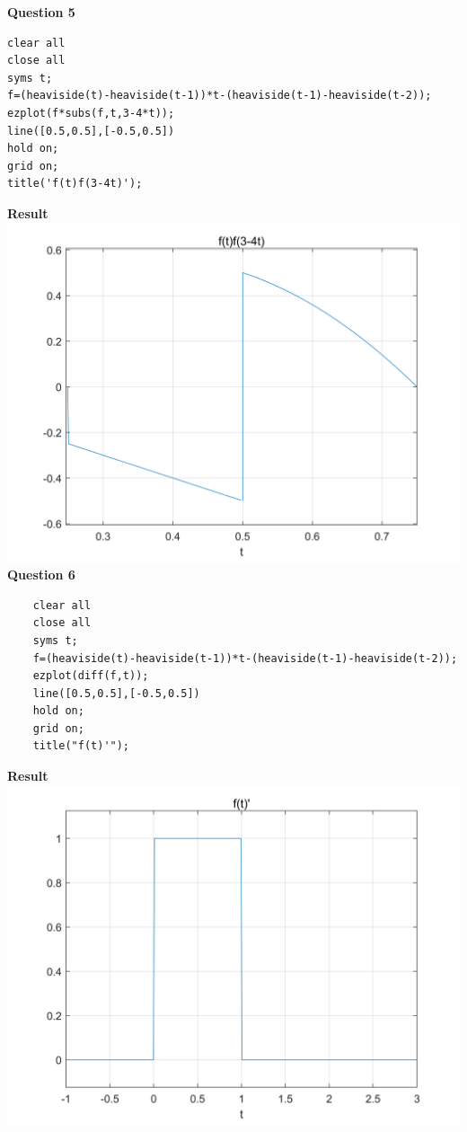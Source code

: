 \documentclass[UTF8,a4paper]{article}
\begin{document}
\textbf{Question 5}\\
\begin{lstlisting}
clear all
close all
syms t;
f=(heaviside(t)-heaviside(t-1))*t-(heaviside(t-1)-heaviside(t-2));
ezplot(f*subs(f,t,3-4*t));
line([0.5,0.5],[-0.5,0.5])
hold on;
grid on;
title('f(t)f(3-4t)');
\end{lstlisting}
\textbf{Result}\\
\includegraphics[scale=0.6]{符号1-5.png}\\
\textbf{Question 6}\\
\begin{lstlisting}
    clear all
    close all
    syms t;
    f=(heaviside(t)-heaviside(t-1))*t-(heaviside(t-1)-heaviside(t-2));
    ezplot(diff(f,t));
    line([0.5,0.5],[-0.5,0.5])
    hold on;
    grid on;
    title("f(t)'");
\end{lstlisting}
\textbf{Result}\\
\includegraphics[scale=0.6]{符号1-6.png}\\
\end{document}
